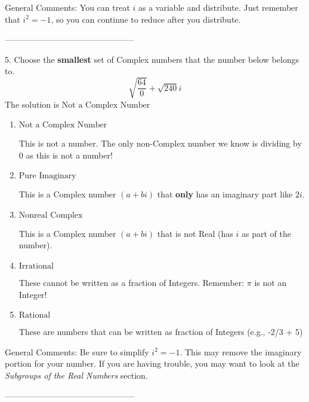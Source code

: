 \documentclass{article}[14pt]
\begin{document}
General Comments: You can treat $i$ as a variable and distribute. Just remember that $i^2=-1$, so you can continue to reduce after you distribute.

-----------------------------------------------

5. Choose the \textbf{smallest} set of Complex numbers that the number below belongs to.
$$ \sqrt{\frac{64}{0}}+\sqrt{240} i $$ 
The solution is $ \text{Not a Complex Number} $ 

\begin{enumerate}[label=\Alph*.] 
\item $ \text{Not a Complex Number} $ 

 This is not a number. The only non-Complex number we know is dividing by 0 as this is not a number! 
\item $ \text{Pure Imaginary} $ 

 This is a Complex number $(a+bi)$ that \textbf{only} has an imaginary part like $2i$. 
\item $ \text{Nonreal Complex} $ 

 This is a Complex number $(a+bi)$ that is not Real (has $i$ as part of the number). 
\item $ \text{Irrational} $ 

 These cannot be written as a fraction of Integers. Remember: $\pi$ is not an Integer! 
\item $ \text{Rational} $ 

 These are numbers that can be written as fraction of Integers (e.g., -2/3 + 5) 
\end{enumerate} 
 
General Comments: Be sure to simplify $i^2 = -1$. This may remove the imaginary portion for your number. If you are having trouble, you may want to look at the \textit{Subgroups of the Real Numbers} section.

-----------------------------------------------
\end{document}
